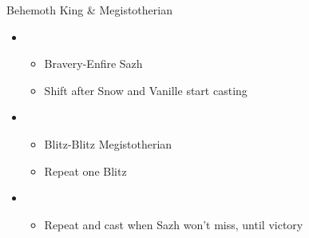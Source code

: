 \begin{battle}{Behemoth King \& Megistotherian}
\begin{itemize}
    \item \fifth
    \begin{itemize}
        \item Bravery-Enfire Sazh
        \item Shift after Snow and Vanille start casting
    \end{itemize}
    \item \second
    \begin{itemize}
        \item Blitz-Blitz Megistotherian
        \item Repeat one Blitz
    \end{itemize}
    \item \fourth
    \begin{itemize}
        \item Repeat and cast when Sazh won't miss, until victory
    \end{itemize}
\end{itemize}
\end{battle}

